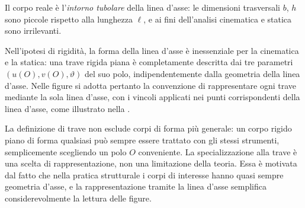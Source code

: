 Il corpo reale è l'\emph{intorno tubolare} della
linea d'asse: le dimensioni trasversali $b$, $h$
sono piccole rispetto alla lunghezza $\ell$, e ai
fini dell'analisi cinematica e statica sono
irrilevanti.

Nell'ipotesi di rigidità, la forma della linea d'asse è
inessenziale per la cinematica e la statica: una trave
rigida piana è completamente descritta dai tre parametri
$(u(O), v(O), \vartheta)$ del suo polo, indipendentemente
dalla geometria della linea d'asse. Nelle figure si adotta
pertanto la convenzione di rappresentare ogni trave
mediante la sola linea d'asse, con i vincoli applicati
nei punti corrispondenti della linea d'asse, come
illustrato nella .




\begin{oss}
	La definizione di trave non esclude corpi di forma
	più generale: un corpo rigido piano di forma
	qualsiasi può sempre essere trattato con gli stessi
	strumenti, semplicemente scegliendo un polo $O$
	conveniente. La specializzazione alla trave è una
	scelta di rappresentazione, non una limitazione
	della teoria. Essa è motivata dal fatto che nella
	pratica strutturale i corpi di interesse hanno quasi
	sempre geometria d'asse, e la rappresentazione
	tramite la linea d'asse semplifica considerevolmente
	la lettura delle figure.
\end{oss}

